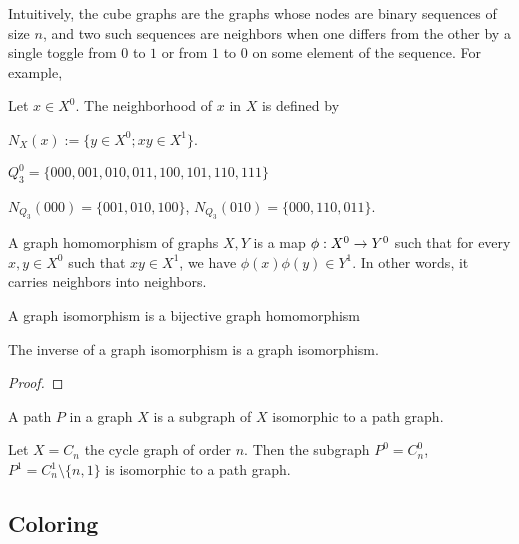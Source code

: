 Intuitively, the cube graphs are the graphs whose nodes are binary sequences of size $n$, and two such sequences are neighbors when one differs from the other by a single toggle from $0$ to $1$ or from $1$ to $0$ on some element of the sequence. For example, 

\begin{definition}
	Let $x \in X^0$. The neighborhood of $x$ in $X$ is defined by 
	
	\begin{center}
		$N_X(x) := \{y \in X^0; xy \in X^1 \}$.
	\end{center}
\end{definition}

\begin{exmp}
	\begin{center}
		$Q_3^0 = \{000, 001, 010, 011, 100,101,110,111\}$
		
		$N_{Q_3}(000) = \{001, 010, 100\}$, $N_{Q_3}(010) = \{000, 110, 011\}$.
	\end{center}
	
\end{exmp}

\begin{definition}
	A graph homomorphism of graphs $X, Y$ is a map $\phi: X^0 \rightarrow Y^0$ such that for every $x, y \in X^0$ such that $xy \in X^1$, we have $\phi(x)\phi(y) \in Y^1$. In other words, it carries neighbors into neighbors.
	
	A graph isomorphism is a bijective graph homomorphism
\end{definition}

\begin{lemma}
	The inverse of a graph isomorphism is a graph isomorphism.
\end{lemma}

\begin{proof}
	
\end{proof}

\begin{definition}
	A path $P$ in a graph $X$ is a subgraph of $X$ isomorphic to a path graph. 
\end{definition}

\begin{exmp}
	Let $X = C_n$ the cycle graph of order $n$. Then the subgraph $P^0 = C_n^0$, $P^1 = C_n^1 \setminus \{n, 1\}$ is isomorphic to a path graph.
\end{exmp}


\subsection{Coloring}


